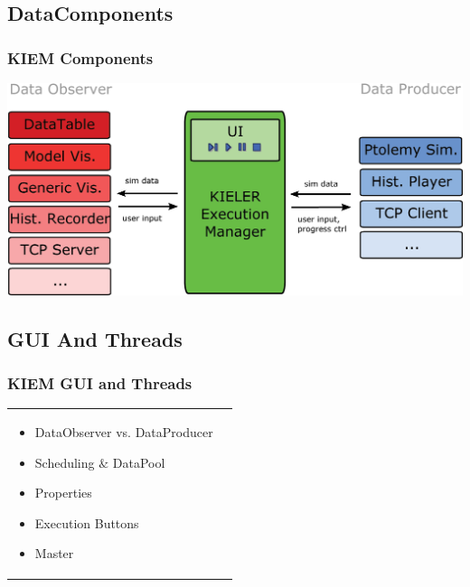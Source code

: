 \subsection[DataComponents]{DataComponents}
\begin{frame}
  \frametitle{KIEM Components}
			\includegraphics[scale=0.30]{images/kiem.png}
  \end{frame}


\subsection[GUI And Threads]{GUI And Threads}
\begin{frame}
  \frametitle{KIEM GUI and Threads}
  			\begin{tabular}[h]{l r}
			   \parbox{0.56\textwidth}{
			}
   			\parbox{0.44\textwidth}{   
\begin{itemize}
	\item DataObserver vs. DataProducer
	\pause
	\item Scheduling $\&$ DataPool
	\pause
	\item Properties
	\pause
	\item Execution Buttons
	\pause
	\item Master
\end{itemize}
}
		\end{tabular}	

  \end{frame}


